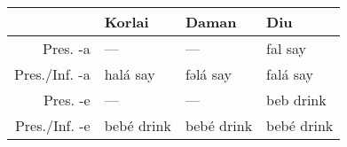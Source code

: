 \documentclass[output=paper,colorlinks,citecolor=brown]{langscibook}
\begin{document}
\label{sec:clements:Appendix-A}
\begin{table}[H]
  \small
\begin{tabularx}{\textwidth}{rQQQ}
\lsptoprule
  &  {Korlai} & {Daman} & {Diu}\\
\midrule
{Pres.}                      {-a} & { ---}  & { ---} & { fal say}\\
{ Pres./Inf.     -a} & { halá say} & { fəlá say} & { falá say}\\
{ Pres.                      -e} & { ---} & { ---} & { beb drink}\\
{ Pres./Inf.     -e} & { bebé drink} & { bebé drink} & { bebé drink}\\


\end{tabularx}
\end{table}
\end{document}
